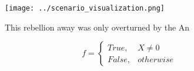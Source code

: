 \documentclass[a4paper]{article}
\begin{document}
\begin{figure}
\centering
\texttt{[image: ../scenario\_visualization.png]}
\caption{This rebellion away was only overturned by the An
}
\end{figure}
 
\begin{equation}   f =
\begin{cases} True, & X \neq 0\\
False, & otherwise
\end{cases}
\end{equation}
\end{document}
